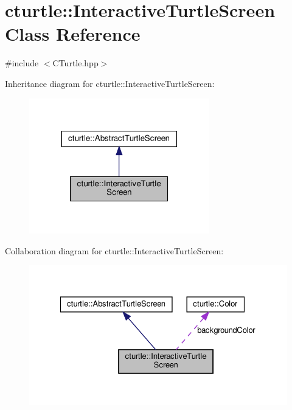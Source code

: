\hypertarget{classcturtle_1_1InteractiveTurtleScreen}{}\section{cturtle\+:\+:Interactive\+Turtle\+Screen Class Reference}
\label{classcturtle_1_1InteractiveTurtleScreen}


{\ttfamily \#include $<$C\+Turtle.\+hpp$>$}



Inheritance diagram for cturtle\+:\+:Interactive\+Turtle\+Screen\+:
\nopagebreak
\begin{figure}[H]
\begin{center}
\leavevmode
\includegraphics[width=222pt]{classcturtle_1_1InteractiveTurtleScreen__inherit__graph}
\end{center}
\end{figure}


Collaboration diagram for cturtle\+:\+:Interactive\+Turtle\+Screen\+:
\nopagebreak
\begin{figure}[H]
\begin{center}
\leavevmode
\includegraphics[width=328pt]{classcturtle_1_1InteractiveTurtleScreen__coll__graph}
\end{center}
\end{figure}
